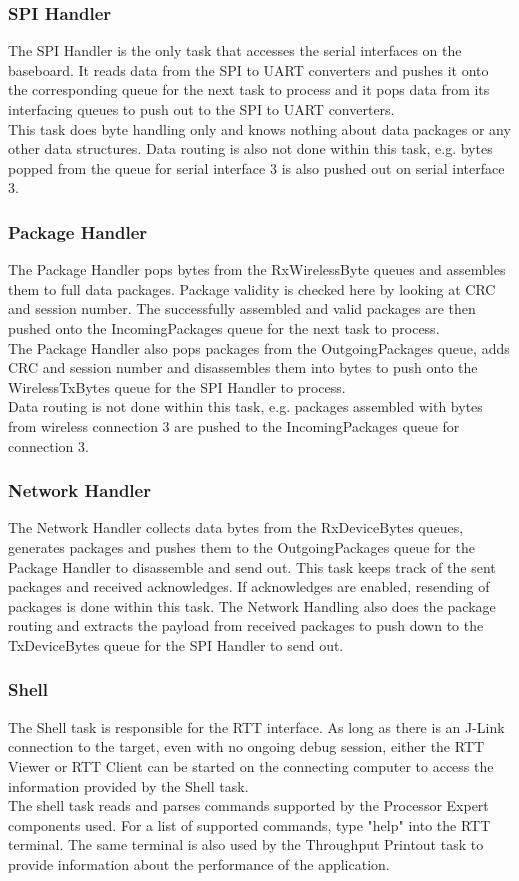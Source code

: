 \subsubsection{SPI Handler}
The SPI Handler is the only task that accesses the serial interfaces on the baseboard. It reads data from the SPI to UART converters and pushes it onto the corresponding queue for the next task to process and it pops data from its interfacing queues to push out to the SPI to UART converters.\\
This task does byte handling only and knows nothing about data packages or any other data structures. Data routing is also not done within this task, e.g. bytes popped from the queue for serial interface 3 is also pushed out on serial interface 3.
%
\subsubsection{Package Handler}
The Package Handler pops bytes from the RxWirelessByte queues and assembles them to full data packages. Package validity is checked here by looking at CRC and session number. The successfully assembled and valid packages are then pushed onto the IncomingPackages queue for the next task to process.\\
The Package Handler also pops packages from the OutgoingPackages queue, adds CRC and session number and disassembles them into bytes to push onto the WirelessTxBytes queue for the SPI Handler to process.\\
Data routing is not done within this task, e.g. packages assembled with bytes from wireless connection 3 are pushed to the IncomingPackages queue for connection 3.
%
\subsubsection{Network Handler}
The Network Handler collects data bytes from the RxDeviceBytes queues, generates packages and pushes them to the OutgoingPackages queue for the Package Handler to disassemble and send out. This task keeps track of the sent packages and received acknowledges. If acknowledges are enabled, resending of packages is done within this task. The Network Handling also does the package routing and extracts the payload from received packages to push down to the TxDeviceBytes queue for the SPI Handler to send out.
%
\subsubsection{Shell}
The Shell task is responsible for the RTT interface. As long as there is an J-Link connection to the target, even with no ongoing debug session, either the RTT Viewer or RTT Client can be started on the connecting computer to access the information provided by the Shell task.\\
The shell task reads and parses commands supported by the Processor Expert components used. For a list of supported commands, type "help" into the RTT terminal. The same terminal is also used by the Throughput Printout task to provide information about the performance of the application.
%
